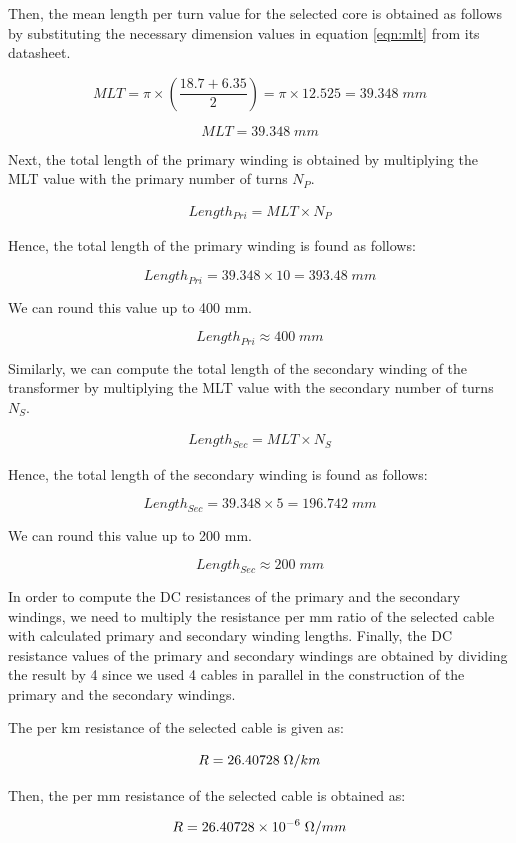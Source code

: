 Then, the mean length per turn value for the selected core is obtained as follows by substituting the necessary dimension values in equation \eqref{eqn:mlt} from its datasheet.

$$ MLT = \pi \times (\frac{18.7 + 6.35}{2}) = \pi \times 12.525 = 39.348\; mm $$

$$ MLT = 39.348\; mm $$

Next, the total length of the primary winding is obtained by multiplying the MLT value with the primary number of turns $N_P$.

\begin{align}
    Length_{Pri} = MLT\times N_P
\end{align}

Hence, the total length of the primary winding is found as follows:

$$ Length_{Pri} = 39.348\times 10 = 393.48\; mm $$

We can round this value up to 400 mm.

$$ Length_{Pri} \approx 400\; mm $$

Similarly, we can compute the total length of the secondary winding of the transformer by multiplying the MLT value with the secondary number of turns $N_S$.

\begin{align}
    Length_{Sec} = MLT\times N_S
\end{align}

Hence, the total length of the secondary winding is found as follows:

$$ Length_{Sec} = 39.348\times 5 = 196.742\; mm $$

We can round this value up to 200 mm.

$$ Length_{Sec} \approx 200\; mm $$

In order to compute the DC resistances of the primary and the secondary windings, we need to multiply the resistance per mm ratio of the selected cable with calculated primary and secondary winding lengths. Finally, the DC resistance values of the primary and secondary windings are obtained by dividing the result by 4 since we used 4 cables in parallel in the construction of the primary and the secondary windings.

The per km resistance of the selected cable is given as:

$$ R = 26.40728\; \ohm / km  $$

Then, the per mm resistance of the selected cable is obtained as:

$$ R = 26.40728\times 10^{-6}\; \ohm / mm  $$

